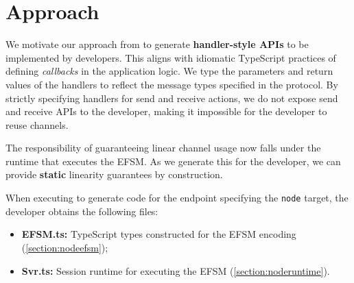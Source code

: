 \section{Approach}
\label{section:nodeapproach}

We motivate our approach from \cite{PureScript2019, HuJava}
to generate \textbf{handler-style APIs} to be implemented
by developers.
This aligns with idiomatic TypeScript practices of defining
\textit{callbacks} in the application logic.
We type the parameters and return values of the handlers to
reflect the message types specified in the protocol.
By strictly specifying handlers for send and receive actions,
we do not expose send and receive APIs to the developer,
making it impossible for the developer to reuse channels.

The responsibility of guaranteeing linear channel usage now falls
under the runtime that executes the EFSM.
As we generate this for the developer,
we can provide \textbf{static}
linearity guarantees by construction.

When executing  to generate code for the
 endpoint specifying the \texttt{node} target,
the developer obtains the following files:

\begin{itemize}
\item \textbf{EFSM.ts:} TypeScript types constructed for 
the EFSM encoding (\cref{section:nodeefsm});
\item \textbf{Svr.ts:} Session runtime for executing the EFSM 
(\cref{section:noderuntime}).
\end{itemize}